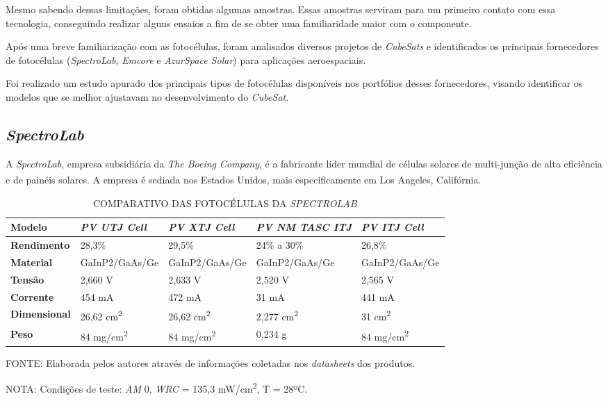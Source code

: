 \documentclass[
	12pt,				%
	openright,			%
	oneside,			%
	a4paper,			%
	english,			%
	french,				%
	spanish,			%
	brazil,				%
	oldfontcommands
	]{abntex2}
\begin{document}
	Mesmo sabendo dessas limitações, foram obtidas algumas amostras. Essas amostras serviram para um primeiro contato com essa tecnologia, conseguindo realizar alguns ensaios a fim de se obter uma familiaridade maior com o componente.
	
	Após uma breve familiarização com as fotocélulas, foram analisados diversos projetos de \textit{CubeSats} e identificados os principais fornecedores de fotocélulas (\textit{SpectroLab}, \textit{Emcore} e \textit{AzurSpace Solar}) para aplicações aeroespaciais.
	
	Foi realizado um estudo apurado dos principais tipos de fotocélulas disponíveis nos portfólios desses fornecedores, visando identificar os modelos que se melhor ajustavam no desenvolvimento do \textit{CubeSat}.
	
\subsection[SpectroLab]{\textit{SpectroLab}}
	
	A \textit{SpectroLab}, empresa subsidiária da \textit{The Boeing Company}, é a fabricante líder mundial de células solares de multi-junção de alta eficiência e de painéis solares. A empresa é sediada nos Estados Unidos, mais especificamente em Los Angeles, Califórnia.\textsuperscript{\cite{SpectroLab}}
	
	\begin{table}[th]
	\caption{COMPARATIVO DAS FOTOCÉLULAS DA \textit{SPECTROLAB}}
	\label{Tab_Spectro_Comp}
	\begin{tabular}{p{2.5cm}|p{3.1cm}|p{3.1cm}|p{3.1cm}|p{3.1cm}}
		\textbf{Modelo} & \textit{\textbf{PV UTJ Cell}} & \textit{\textbf{PV XTJ Cell}} & \textit{\textbf{PV NM TASC ITJ}} & \textit{\textbf{PV ITJ Cell}} \\
		\hline
		\textbf{Rendimento} & 28,3\% & 29,5\% & 24\% a 30\% & 26,8\% \\
		\hline
		\textbf{Material} & GaInP2/GaAs/Ge & GaInP2/GaAs/Ge & GaInP2/GaAs/Ge & GaInP2/GaAs/Ge\\
		\hline
		\textbf{Tensão} & 2,660 V & 2,633 V & 2,520 V & 2,565 V\\
		\hline
		\textbf{Corrente} & 454 mA & 472 mA & 31 mA & 441 mA\\
		\hline
		\textbf{Dimensional} & 26,62 cm\textsuperscript{2} & 26,62 cm\textsuperscript{2} & 2,277 cm\textsuperscript{2} & 31 cm\textsuperscript{2}\\
		\hline
		\textbf{Peso} & 84 mg/cm\textsuperscript{2} & 84 mg/cm\textsuperscript{2} & 0,234 g & 84 mg/cm\textsuperscript{2}\\
	\end{tabular}
	
	\begin{small}
	\vspace{3pt}
		FONTE: Elaborada pelos autores através de informações coletadas nos \textit{datasheets} dos produtos.
	\end{small}
	\begin{footnotesize}
		NOTA: Condições de teste: \textit{AM} 0, \textit{WRC} = 135,3 mW/cm\textsuperscript{2}, T = 28ºC.
	\end{footnotesize}
	\end{table}
\end{document}
